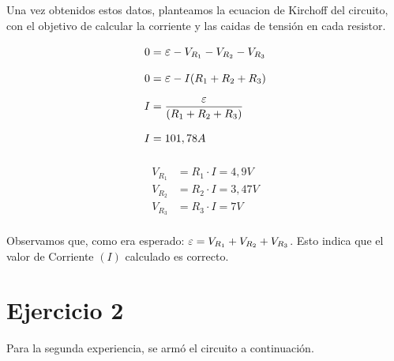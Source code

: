 \documentclass[12pt]{report}
\newcommand {\LEpsilon}{\mathlarger\varepsilon}
\begin{document}
Una vez obtenidos estos datos, planteamos la ecuacion de Kirchoff del circuito,
con el objetivo de calcular la corriente y las caidas de tensión en cada resistor.

\begin{minipage}[t]{0.48\textwidth}
  $$
  \begin{aligned}
    0 &= \LEpsilon - V_{R_1} - V_{R_2} - V_{R_3}\\[6pt]
    0 &= \LEpsilon - I (R_1 + R_2 + R_3)\\[6pt]
    I &= \frac{\LEpsilon}{(R_1 + R_2 + R_3)}\\[6pt]
    I &= 101,78A\\[6pt]
  \end{aligned}
  $$
\end{minipage}
\hfill
\begin{minipage}[t]{0.48\textwidth}
  \vspace{7mm}
  $$
  \begin{aligned}
    V_{R_1} &= R_1 \cdot I = 4,9 V\\[6pt]
    V_{R_2} &= R_2 \cdot I = 3,47 V\\[6pt]
    V_{R_3} &= R_3 \cdot I = 7 V\\[6pt]
  \end{aligned}
  $$
\end{minipage}

Observamos que, como era esperado: $\LEpsilon =  V_{R_1} + V_{R_2} + V_{R_3}$. Esto 
indica que el valor de Corriente $(I)$ calculado es correcto.

%
%
%
%

\chapter{Ejercicio 2}
Para la segunda experiencia, se armó el circuito a continuación.
\end{document}
